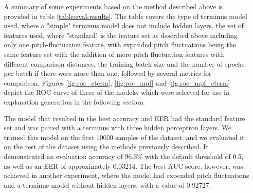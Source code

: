 \documentclass{article}
\begin{document}
		\sloppy
		A summary of some experiments based on the method described above is provided in table
		\ref{table:eval-results}. The table covers the type of terminus model used, where a
		"simple" terminus model does not include hidden layers, the set of features used, where
		"standard" is the feature set as described above including only one pitch-fluctuation
		feature, with expanded pitch fluctuations being the same feature set with the addition of
		more pitch fluctuation features with different comparison distances, the training batch
		size and the number of epochs per batch if there were more than one, followed by several
		metrics for comparison. Figures \ref{fig:roc_cterm}, \ref{fig:roc_mpf} and
		\ref{fig:roc_mpf_cterm} depict the ROC curve of three of the models, which were selected
		for use in explanation generation in the following section.
		\par
		The model that resulted in the best accuracy and EER had the standard feature set and was
		paired with a terminus with three hidden perceptron layers. We trained this model on the
		first 10000 samples of the dataset, and we evaluated it on the rest of the dataset using
		the methods previously described. It demonstrated an evaluation accuracy of 96.3\% with
		the default threshold of 0.5, as well as an EER of approximately 0.03214. The best AUC
		score, however, was achieved in another experiment, where the model had expended pitch
		fluctuations and a terminus model without hidden layers, with a value of 0.92727.
\end{document}
